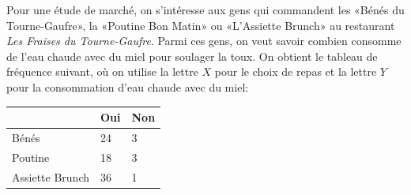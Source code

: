 \begin{questions}

\pageblanche

\question\label{asso} Pour une étude de marché, on s'intéresse aux gens qui commandent les «Bénés du Tourne-Gaufre», la «Poutine Bon Matin» ou «L'Assiette Brunch» au restaurant \textit{Les Fraises du Tourne-Gaufre}.
Parmi ces gens, on veut savoir combien consomme de l'eau chaude avec du miel pour soulager la toux.
On obtient le tableau de fréquence suivant, où on utilise la lettre $X$ pour le choix de repas et la lettre $Y$ pour la consommation d'eau chaude avec du miel:

\renewcommand{\arraystretch}{2} %

\begin{table}[h]
    \centering
    \begin{tabular}{|P{3cm}|P{2cm}|P{2cm}|}
    \hline
         & Oui & Non \\
        \hline
         Bénés & 24 & 3\\
         \hline
         Poutine & 18 & 3\\
         \hline
         Assiette Brunch & 36 & 1\\
         \hline
    \end{tabular}

\end{table}

\end{questions}
